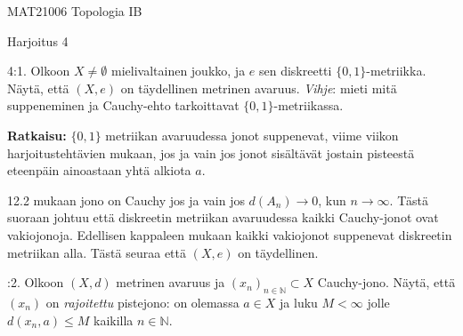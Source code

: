 \documentclass[12pt,a4paper,leqno]{amsart}
\begin{document}
\noindent MAT21006 Topologia IB

\noindent Harjoitus 4 

\begin{comment}

\noindent  Määräaika:  \textbf{torstaina 18.4.2024 klo 23.00 mennessä} 

\bigskip

\noindent Ratkaisut palautetaan sähköisesti määräaikaan mennessä kurssin Moodle sivun viikottaiseen palautusalueeseen yhtenä (1) pdf-lähetyksenä. 

\smallskip

Normaalit ohjausvuorot: tiistaina  klo 14.15-16  salissa  C322 ja  torstaina  klo 14-16 Ratkomossa  (kurssin Topologia IB ohjaaja).
Muina aikoina voi  kysyä  neuvoja tehtäviin Ratkomossa tai kurssin Moodle sivun Keskustelualueissa. Kurssin Topologia IA
Telegram-ryhmä jatkaa. 

\medskip

Aihepiiri:  Luku 12. \textit{Täydellisyys ja tasainen jatkuvuus} Väisälän kirjasta [V]. 

\bigskip
\end{comment}

4:1.  Olkoon $X \neq \emptyset$ mielivaltainen joukko, ja $e$ sen diskreetti $\{0,1\}$-metriikka. 
Näytä, että $(X,e)$ on täydellinen metrinen avaruus.
\textit{Vihje}: mieti mitä suppeneminen ja Cauchy-ehto  tarkoittavat $\{0,1\}$-metriikassa. 

\textbf{Ratkaisu: }
$\{0,1\}$ metriikan avaruudessa jonot suppenevat, viime viikon harjoitustehtävien mukaan, jos ja vain jos jonot sisältävät jostain pisteestä eteenpäin ainoastaan yhtä alkiota $a$. 

12.2 mukaan jono on Cauchy jos ja vain jos $d(A_n) \to 0$, kun $n \to \infty$. Tästä suoraan johtuu että diskreetin metriikan avaruudessa kaikki Cauchy-jonot ovat vakiojonoja. Edellisen kappaleen mukaan kaikki vakiojonot suppenevat diskreetin metriikan alla. Tästä seuraa että $(X, e)$ on täydellinen.



\bigskip

:2. Olkoon $(X,d)$ metrinen avaruus ja $(x_n)_{n \in \mathbb N} \subset X$ Cauchy-jono. 
Näytä, että $(x_n)$ on \textit{rajoitettu} pistejono: on olemassa $a \in X$ ja luku $M < \infty$ jolle 
$d(x_n,a) \le M$ kaikilla $n \in \mathbb N$.
\end{document}

